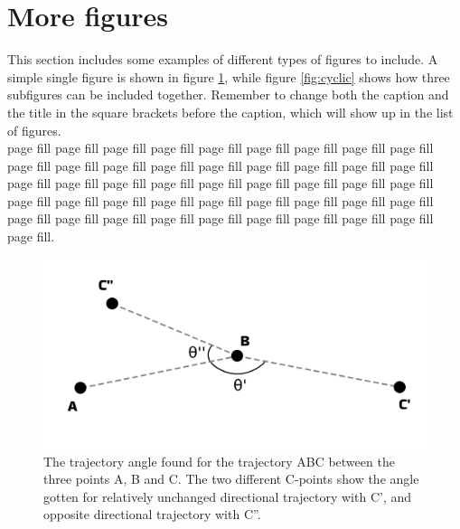 
\section{More figures}

This section includes some examples of different types of figures to include. A simple single figure is shown in figure \ref{fig:trajectory_angle}, while figure \ref{fig:cyclic} shows how three subfigures can be included together. Remember to change both the caption and the title in the square brackets before the caption, which will show up in the list of figures. \\

\noindent page fill page fill page fill page fill page fill page fill page fill page fill page fill page fill page fill page fill page fill page fill page fill page fill page fill page fill page fill page fill page fill page fill page fill page fill page fill page fill page fill page fill page fill page fill page fill page fill page fill page fill page fill page fill page fill page fill page fill page fill page fill page fill page fill page fill page fill page fill.

\begin{figure}[H]
  \centering
  \includegraphics[width=1\textwidth]{Figures/trajectory angle.png}
  \caption[Trajectory angle]{The trajectory angle found for the trajectory ABC between the three points A, B and C. The two different C-points show the angle gotten for relatively unchanged directional trajectory with C', and opposite directional trajectory with C''.}
  \label{fig:trajectory_angle}
\end{figure}



